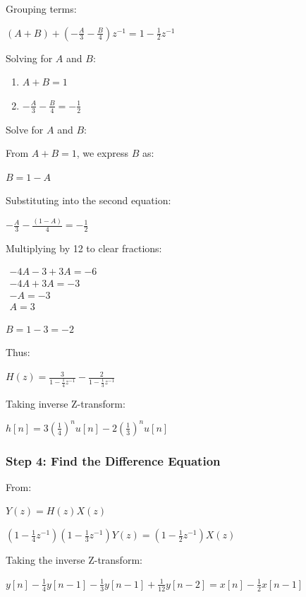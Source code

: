 \documentclass[11pt]{article}
\providecommand{\tightlist}{%
      \setlength{\itemsep}{0pt}\setlength{\parskip}{0pt}}
\begin{document}
Grouping terms:

\(( A + B ) + \left( -\frac{A}{3} - \frac{B}{4} \right) z^{-1} = 1 - \frac{1}{2} z^{-1}\)

Solving for \(A\) and \(B\):

\begin{enumerate}
\def\labelenumi{\arabic{enumi}.}
\tightlist
\item
  \(A + B = 1\)
\item
  \(-\frac{A}{3} - \frac{B}{4} = -\frac{1}{2}\)
\end{enumerate}

Solve for \(A\) and \(B\):

From \(A + B = 1\), we express \(B\) as:

\(B = 1 - A\)

Substituting into the second equation:

\(-\frac{A}{3} - \frac{(1 - A)}{4} = -\frac{1}{2}\)

Multiplying by 12 to clear fractions:

\(\begin{align*} -4A - 3 + 3A = -6 \\ -4A + 3A = -3 \\ - A = -3 \\ A = 3 \end{align*}\)

\(B = 1 - 3 = -2\)

Thus:

\(H(z) = \frac{3}{1 - \frac{1}{4} z^{-1}} - \frac{2}{1 - \frac{1}{3} z^{-1}}\)

Taking inverse Z-transform:

\(h[n] = 3 \left(\frac{1}{4}\right)^n u[n] - 2 \left(\frac{1}{3}\right)^n u[n]\)

\subsubsection{\texorpdfstring{\textbf{Step 4: Find the Difference
Equation}}{Step 4: Find the Difference Equation}}\label{step-4-find-the-difference-equation}

From:

\(Y(z) = H(z) X(z)\)

\((1 - \frac{1}{4} z^{-1})(1 - \frac{1}{3} z^{-1}) Y(z) = (1 - \frac{1}{2} z^{-1}) X(z)\)

Taking the inverse Z-transform:

\(y[n] - \frac{1}{4} y[n-1] - \frac{1}{3} y[n-1] + \frac{1}{12} y[n-2] = x[n] - \frac{1}{2} x[n-1]\)
\end{document}
